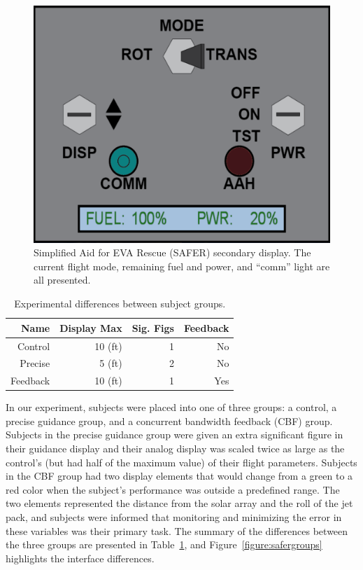 \begin{figure}[tb!]
    \begin{center}
        \includegraphics[width=0.8\linewidth]{figures/Introduction/SAFER_Panel.png}
        \caption[Simplified Aid for EVA Rescue (SAFER) secondary display]{Simplified Aid for EVA Rescue (SAFER) secondary display. The current flight mode, remaining fuel and power, and ``comm'' light are all presented.}
        \label{figure:saferpanel}
    \end{center}
\end{figure}

\begin{table}[tb!]
    \centering
    \begin{tabular}{rrrr}
        \toprule
        Name     & Display Max & Sig. Figs & Feedback \\
        \midrule
        Control  & 10 (ft)     & 1         & No       \\
        Precise  & 5 (ft)      & 2         & No       \\
        Feedback & 10 (ft)     & 1         & Yes      \\
        \bottomrule
    \end{tabular}
    \caption[Experimental differences between subject groups]{Experimental differences between subject groups.}
    \label{tab:group_diffs}
\end{table}

In our experiment, subjects were placed into one of three groups: a control, a precise guidance group, and a concurrent bandwidth feedback (CBF) group.
Subjects in the precise guidance group were given an extra significant figure in their guidance display and their analog display was scaled twice as large as the control's (but had half of the maximum value) of their flight parameters.
Subjects in the CBF group had two display elements that would change from a green to a red color when the subject's performance was outside a predefined range.
The two elements represented the distance from the solar array and the roll of the jet pack, and subjects were informed that monitoring and minimizing the error in these variables was their primary task.
The summary of the differences between the three groups are presented in Table~\ref{tab:group_diffs}, and Figure~\ref{figure:safergroups} highlights the interface differences.

